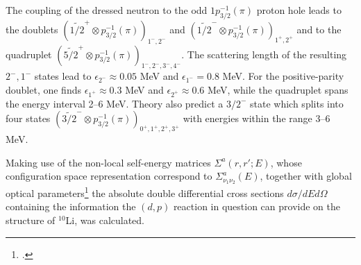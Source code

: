 The coupling of the dressed neutron to the odd $1p_{3/2}^{-1}(\pi)$ proton hole leads to the doublets $(\widetilde{1/2}^+\otimes p_{3/2}^{-1}(\pi))_{1^-,2^-}$ and $(\widetilde{1/2}^-\otimes p_{3/2}^{-1}(\pi))_{1^+,2^+}$ and to the quadruplet $(\widetilde{5/2}^+\otimes p_{3/2}^{-1}(\pi))_{1^-,2^-,3^-,4^-}$. The scattering length of the resulting $2^-,1^-$ states lead to $\epsilon_{2^-}\approx0.05$ MeV and $\epsilon_{1^-}=0.8$ MeV. For the positive-parity doublet, one finds $\epsilon_{1^+}\approx0.3$ MeV and $\epsilon_{2^+}\approx0.6$ MeV, while the quadruplet spans the energy interval 2--6 MeV. Theory also predict a $3/2^-$ state which splits into four states $(\widetilde{3/2}^-\otimes p_{3/2}^{-1}(\pi))_{0^+,1^+,2^+,3^+}$ with energies within the range 3--6 MeV.


Making use of the non-local self-energy matrices $\Sigma^a(r,r';E)$, whose configuration space representation correspond to $\Sigma^a_{\nu_1\nu_2}(E)$, together with global optical parameters\footnote{\cite{Schmitt:13}.} the absolute double differential cross sections $d\sigma/dEd\Omega$ containing  the information the $(d,p)$ reaction in question can provide on the structure of $^{10}$Li, was calculated.

